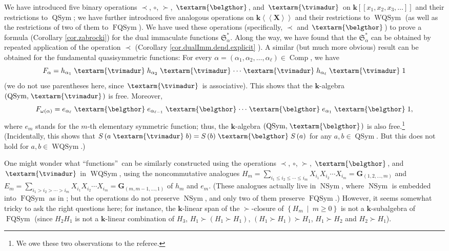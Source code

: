 \documentclass[numbers=enddot,12pt,final,onecolumn,notitlepage,abstracton]{scrartcl}%
\theoremstyle{definition}
\newcommand{\tvi}{\left. \textarm{\tvimadur} \right.}
\newcommand{\bel}{\left. \textarm{\belgthor} \right.}
\let\sumnonlimits\sum
\renewcommand{\sum}{\sumnonlimits\limits}
\begin{document}
We have introduced five binary operations $\left.  \prec\right.  $, $\circ$,
$\left.  \succ\right.  $, $\bel $, and $\tvi $ on $\mathbf{k}\left[  \left[
x_{1},x_{2},x_{3},\ldots\right]  \right]  $ and their restrictions to
$\operatorname*{QSym}$; we have further introduced five analogous operations
on $\mathbf{k}\left\langle \left\langle \mathbf{X}\right\rangle \right\rangle
$ and their restrictions to $\operatorname*{WQSym}$ (as well as the
restrictions of two of them to $\operatorname*{FQSym}$). We have used these
operations (specifically, $\left.  \prec\right.  $ and $\bel $) to prove a
formula (Corollary \ref{cor.zabrocki}) for the dual immaculate functions
$\mathfrak{S}_{\alpha}^{\ast}$. Along the way, we have found that the
$\mathfrak{S}_{\alpha}^{\ast}$ can be obtained by repeated application of the
operation $\left.  \prec\right.  $ (Corollary \ref{cor.dualImm.dend.explicit}%
). A similar (but much more obvious) result can be obtained for the
fundamental quasisymmetric functions: For every $\alpha=\left(  \alpha
_{1},\alpha_{2},\ldots,\alpha_{\ell}\right)  \in\operatorname*{Comp}$, we have%
\[
F_{\alpha}=h_{\alpha_{1}} \tvi h_{\alpha_{2}} \tvi \cdots\tvi h_{\alpha_{\ell
}} \tvi 1
\]
(we do not use parentheses here, since $\tvi $ is associative). This shows
that the $\mathbf{k}$-algebra $\left(  \operatorname*{QSym}, \tvi \right)  $
is free. Moreover,%
\[
F_{\omega\left(  \alpha\right)  }=e_{\alpha_{\ell}} \bel e_{\alpha_{\ell-1}}
\bel \cdots\bel e_{\alpha_{1}} \bel 1,
\]
where $e_{m}$ stands for the $m$-th elementary symmetric function; thus, the
$\mathbf{k}$-algebra $\left(  \operatorname*{QSym}, \bel \right)  $ is also
free.\footnote{We owe these two observations to the referee.} (Incidentally,
this shows that $S\left(  a \tvi b\right)  =S\left(  b\right)  \bel S\left(
a\right)  $ for any $a,b\in\operatorname*{QSym}$. But this does not hold for
$a,b\in\operatorname*{WQSym}$.)

One might wonder what \textquotedblleft functions\textquotedblright\ can be
similarly constructed using the operations $\left.  \prec\right.  $, $\circ$,
$\left.  \succ\right.  $, $\bel $, and $\tvi $ in $\operatorname*{WQSym}$,
using the noncommutative analogues $H_{m}=\sum_{i_{1}\leq i_{2}\leq\cdots\leq
i_{m}}X_{i_{1}}X_{i_{2}}\cdots X_{i_{m}}=\mathbf{G}_{\left(  1,2,\ldots
,m\right)  }$ and $E_{m}=\sum_{i_{1}>i_{2}>\cdots>i_{m}}X_{i_{1}}X_{i_{2}%
}\cdots X_{i_{m}}=\mathbf{G}_{\left(  m,m-1,\ldots,1\right)  }$ of $h_{m}$ and
$e_{m}$. (These analogues actually live in $\operatorname*{NSym}$, where
$\operatorname*{NSym}$ is embedded into $\operatorname*{FQSym}$ as in
\cite[Corollary 8.1.14(b)]{Reiner}; but the operations do not preserve
$\operatorname*{NSym}$, and only two of them preserve $\operatorname*{FQSym}%
$.) However, it seems somewhat tricky to ask the right questions here; for
instance, the $\mathbf{k}$-linear span of the $\left.  \succ\right.  $-closure
of $\left\{  H_{m}\ \mid\ m\geq0\right\}  $ is not a $\mathbf{k}$-subalgebra
of $\operatorname*{FQSym}$ (since $H_{2}H_{1}$ is not a $\mathbf{k}$-linear
combination of $H_{3}$, $H_{1}\left.  \succ\right.  \left(  H_{1}\left.
\succ\right.  H_{1}\right)  $, $\left(  H_{1}\left.  \succ\right.
H_{1}\right)  \left.  \succ\right.  H_{1}$, $H_{1}\left.  \succ\right.  H_{2}$
and $H_{2}\left.  \succ\right.  H_{1}$).
\end{document}
